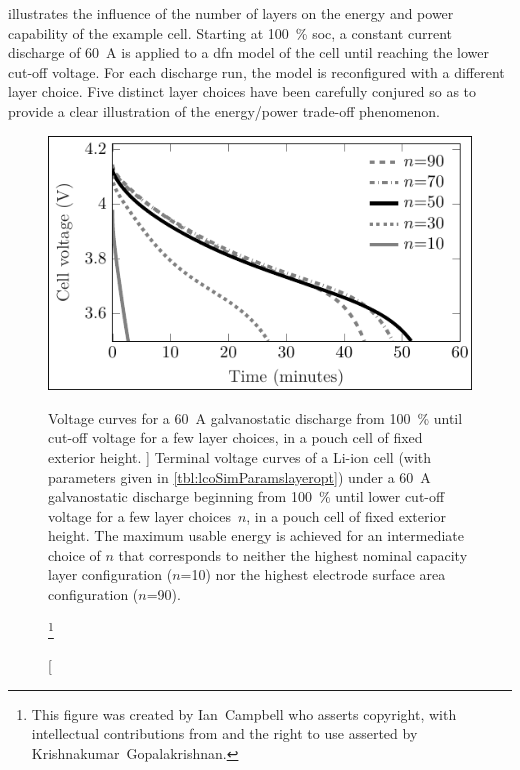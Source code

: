   illustrates  the  influence  of  the  number
of  layers   on  the  energy   and  power   capability  of  the   example  cell.
Starting  at  \SI{100}{\percent}  \gls{soc},  a constant  current  discharge  of
\SI{60}{\ampere}\footnotemark{}  is applied  to a  \gls{dfn} model  of the  cell
until reaching the  lower cut-off voltage. For each discharge  run, the model is
reconfigured  with  a  different  layer  choice.  Five  distinct  layer  choices
have  been carefully  conjured so  as  to provide  a clear  illustration of  the
energy/power trade-off phenomenon.

\begin{figure}[!bp]
    \begin{minipage}[t]{\textwidth}
        \centering
        \includegraphics[trim=4 4 2 4,clip]{fig_CC_discharge_curves.pdf}
        \captionsetup{labelsep=note}
        \caption
        [%
        Voltage curves for a \SI{60}{\ampere} galvanostatic discharge from
        \SI{100}{\percent}  until cut-off voltage for a few layer
        choices, in a pouch cell of fixed exterior height.
        ]%
        {%
            Terminal voltage curves of a Li-ion cell (with parameters
            given in \cref{tbl:lcoSimParamslayeropt}) under a \SI{60}{\ampere}
            galvanostatic discharge beginning from \SI{100}{\percent}
             until lower cut-off voltage for a few layer
            choices~$n$, in a pouch cell of fixed exterior height. The maximum
            usable energy is achieved for an intermediate choice of $n$
            that corresponds to neither the highest nominal capacity layer
            configuration ($n$=\num{10}) nor the highest electrode surface area
            configuration ($n$=\num{90}).
        }%
        \label{fig:fig_CC_discharge_curves}
        \mpfootnotes[1]

        \footnote{This figure was created by \mbox{Ian Campbell} who asserts copyright,
            with intellectual contributions from and the right to use asserted by
        \mbox{Krishnakumar Gopalakrishnan}.}
    \end{minipage}
\end{figure}

